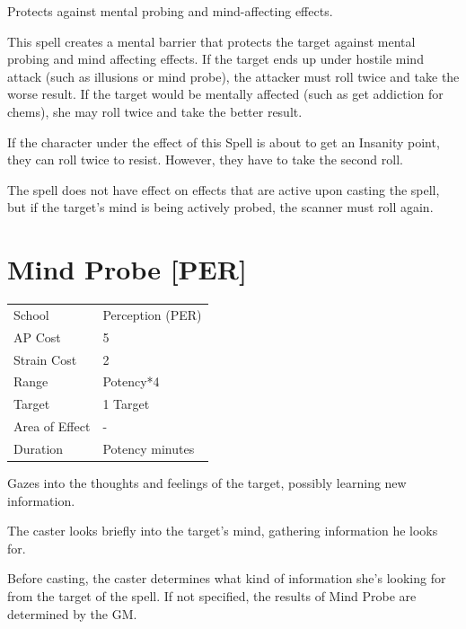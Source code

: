 \documentclass[11pt,a4paper,twocolumn]{book}
\begin{document}
\medskip

Protects against mental probing and mind-affecting effects.

This spell creates a mental barrier that protects the target against mental probing and mind affecting effects. If the target ends up under hostile mind attack (such as illusions or mind probe), the attacker must roll twice and take the worse result. If the target would be mentally affected (such as get addiction for chems), she may roll twice and take the better result. 

If the character under the effect of this Spell is about to get an Insanity point, they can roll twice to resist. However, they have to take the second roll.

The spell does not have effect on effects that are active upon casting the spell, but if the target's mind is being actively probed, the scanner must roll again.

\vfill


\section*{Mind Probe [PER]}
{
	\begin{tabu} to 75mm{| X[l,4] | X[l,7] |}
		\hline
		School 			& Perception (PER) 		\\
        AP Cost	      	& 5 					\\
        Strain Cost     & 2 					\\
        Range     		& Potency*4				\\
        Target      	& 1 Target				\\
        Area of Effect  & -  	 				\\
        Duration     	& Potency minutes	\\ \hline
	\end{tabu}
		
}

\medskip

Gazes into the thoughts and feelings of the target, possibly learning new information.

The caster looks briefly into the target's mind, gathering information he looks for.

Before casting, the caster determines what kind of information she's looking for from the target of the spell. If not specified, the results of Mind Probe are determined by the GM.
\end{document}

